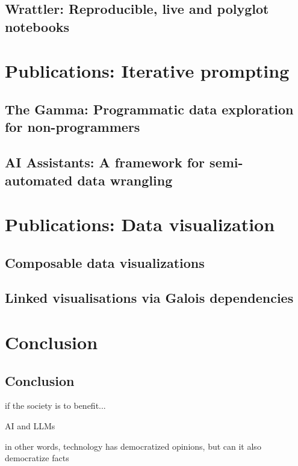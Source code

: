 \documentclass[fleqn,11pt]{report}
\begin{document}
\chapter{Wrattler: Reproducible, live and polyglot notebooks}

\part{Publications: Iterative prompting}

\chapter{The Gamma: Programmatic data exploration for non-programmers}
\chapter{AI Assistants: A framework for semi-automated data wrangling}

\part{Publications: Data visualization}

\chapter{Composable data visualizations}
\chapter{Linked visualisations via Galois dependencies}


\part{Conclusion}

\chapter{Conclusion}

if the society is to benefit...

AI and LLMs

in other words, technology has democratized opinions, but can it also democratize facts


























%

\end{document}
